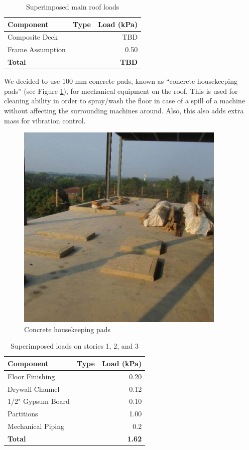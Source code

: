 \documentclass[12pt]{article}
\begin{document}
\begin{table}[h!]
    \centering
    \caption{Superimposed main roof loads}
    \label{tab:selfMain}
    \begin{tabular}{lcr}
        \toprule
        \textbf{Component} & \textbf{Type} & \textbf{Load (kPa)}\\
        \midrule
        Composite Deck &  & TBD\\
        Frame Assumption &  & 0.50\\
        \textbf{Total} & & \textbf{TBD}\\
        \bottomrule
    \end{tabular}
\end{table}

We decided to use 100 mm concrete pads, known as “concrete housekeeping pads” (see Figure \ref{fig:Housekeeping_Pads}), for mechanical equipment on the roof.
This is used for cleaning ability in order to spray/wash the floor in case of a spill of a machine without affecting the surrounding machines around.
Also, this also adds extra mass for vibration control.

\begin{figure}
    \centering
\includegraphics[width=10cm]{Assets/Housekeeping_Pads.png}
\caption{Concrete housekeeping pads}
\label{fig:Housekeeping_Pads}
\end{figure}

\begin{table}[h!]
    \centering
    \caption{Superimposed loads on stories 1, 2, and 3}
    \label{tab:super123}
    \begin{tabular}{lcr}
        \toprule
        \textbf{Component} & \textbf{Type} & \textbf{Load (kPa)}\\
        \midrule
        Floor Finishing &  & 0.20\\
        Drywall Channel &  & 0.12\\
        1/2" Gypsum Board &  & 0.10\\
        Partitions &  & 1.00\\
        Mechanical Piping &  & 0.2\\
        \textbf{Total} & & \textbf{1.62}\\
        \bottomrule
    \end{tabular}
\end{table}
\end{document}
